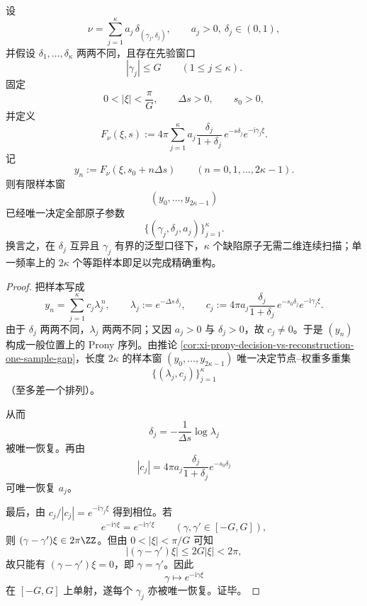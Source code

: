 \begin{theorem}[单频有限采样的精确层析重构]\label{thm:xi-time-part9xd-single-frequency-sampling-exact-tomography}
设
\[
\nu=\sum_{j=1}^{\kappa}a_j\,\delta_{(\gamma_j,\delta_j)},
\qquad
a_j>0,\ \delta_j\in(0,1),
\]
并假设 \(\delta_1,\dots,\delta_\kappa\) 两两不同，且存在先验窗口
\[
|\gamma_j|\le G\qquad(1\le j\le \kappa).
\]
固定
\[
0<|\xi|<\frac{\pi}{G},
\qquad
\Delta s>0,
\qquad
s_0>0,
\]
并定义
\[
F_\nu(\xi,s):=
4\pi\sum_{j=1}^{\kappa}
a_j\frac{\delta_j}{1+\delta_j}\,
e^{-s\delta_j}e^{-\mathrm{i}\gamma_j\xi}.
\]
记
\[
y_n:=F_\nu(\xi,s_0+n\Delta s)
\qquad (n=0,1,\dots,2\kappa-1).
\]
则有限样本窗
\[
(y_0,\dots,y_{2\kappa-1})
\]
已经唯一决定全部原子参数
\[
\{(\gamma_j,\delta_j,a_j)\}_{j=1}^{\kappa}.
\]
换言之，在 \(\delta_j\) 互异且 \(\gamma_j\) 有界的泛型口径下，\(\kappa\) 个缺陷原子无需二维连续扫描；单一频率上的 \(2\kappa\) 个等距样本即足以完成精确重构。
\end{theorem}

\begin{proof}
把样本写成
\[
y_n=
\sum_{j=1}^{\kappa}c_j\lambda_j^{\,n},
\qquad
\lambda_j:=e^{-\Delta s\,\delta_j},
\qquad
c_j:=
4\pi a_j\frac{\delta_j}{1+\delta_j}\,
e^{-s_0\delta_j}e^{-\mathrm{i}\gamma_j\xi}.
\]
由于 \(\delta_j\) 两两不同，\(\lambda_j\) 两两不同；又因 \(a_j>0\) 与 \(\delta_j>0\)，故 \(c_j\neq 0\)。于是 \((y_n)\) 构成一般位置上的 Prony 序列。由推论 \ref{cor:xi-prony-decision-vs-reconstruction-one-sample-gap}，长度 \(2\kappa\) 的样本窗 \((y_0,\dots,y_{2\kappa-1})\) 唯一决定节点--权重多重集
\[
\{(\lambda_j,c_j)\}_{j=1}^{\kappa}
\]
（至多差一个排列）。

从而
\[
\delta_j=-\frac{1}{\Delta s}\log \lambda_j
\]
被唯一恢复。再由
\[
|c_j|=
4\pi a_j\frac{\delta_j}{1+\delta_j}e^{-s_0\delta_j}
\]
可唯一恢复 \(a_j\)。

最后，由 \(c_j/|c_j|=e^{-\mathrm{i}\gamma_j\xi}\) 得到相位。若
\[
e^{-\mathrm{i}\gamma\xi}=e^{-\mathrm{i}\gamma'\xi}
\qquad
(\gamma,\gamma'\in[-G,G]),
\]
则 \((\gamma-\gamma')\xi\in 2\pi\ZZ\)。但由 \(0<|\xi|<\pi/G\) 可知
\[
|(\gamma-\gamma')\xi|\le 2G|\xi|<2\pi,
\]
故只能有 \((\gamma-\gamma')\xi=0\)，即 \(\gamma=\gamma'\)。因此
\[
\gamma\longmapsto e^{-\mathrm{i}\gamma\xi}
\]
在 \([-G,G]\) 上单射，遂每个 \(\gamma_j\) 亦被唯一恢复。证毕。
\end{proof}


